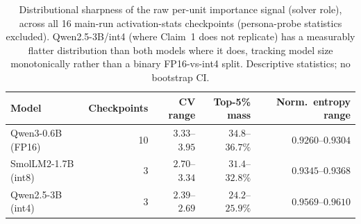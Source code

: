 \begin{table}[t]
\centering
\caption{Distributional sharpness of the raw per-unit importance signal (solver role), across
all 16 main-run activation-stats checkpoints (persona-probe statistics excluded). Qwen2.5-3B/int4 (where Claim~1 does not replicate)
has a measurably flatter distribution than both models where it does, tracking model size
monotonically rather than a binary FP16-vs-int4 split. Descriptive statistics; no bootstrap CI.}
\label{tab:entropy-diagnostic}
\begin{tabular}{lrrrr}
\toprule
Model & Checkpoints & CV range & Top-5\% mass & Norm.\ entropy range \\
\midrule
Qwen3-0.6B (FP16)        & 10 & $3.33$--$3.95$ & $34.8$--$36.7\%$ & $0.9260$--$0.9304$ \\
SmolLM2-1.7B (int8)      & 3  & $2.70$--$3.34$ & $31.4$--$32.8\%$ & $0.9345$--$0.9368$ \\
Qwen2.5-3B (int4)        & 3  & $2.39$--$2.69$ & $24.2$--$25.9\%$ & $0.9569$--$0.9610$ \\
\bottomrule
\end{tabular}
\end{table}
